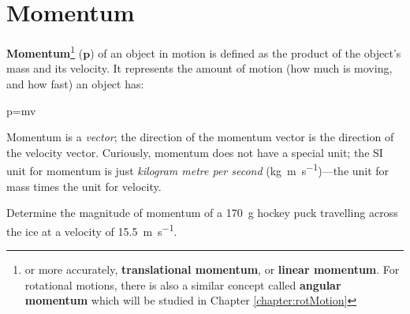 \section{Momentum}
\textbf{Momentum}\footnote{or more accurately, \textbf{translational
  momentum}, or \textbf{linear momentum}. For rotational motions, there is
also a similar concept called \textbf{angular momentum} which will be
studied in Chapter \ref{chapter:rotMotion}} ($\bm p$) of an object in motion
is defined as the product of the object's mass and its velocity. It represents
the amount of motion (how much is moving, and how fast) an object has:
\begin{important-equation}
  \quad
  \bm p=m\bm v
\end{important-equation}
Momentum is a \emph{vector}; the direction of the momentum vector is the
direction of the velocity vector. Curiously, momentum does not have a special
unit; the SI unit for momentum is just \emph{kilogram metre per second}
(\si{\kilo\gram\metre\per\second})---the unit for mass times the unit for
velocity.


\begin{example}
  Determine the magnitude of momentum of a \SI{170}{\gram} hockey puck
  travelling across the ice at a velocity of \SI{15.5}{\metre\per\second}.
\end{example}

